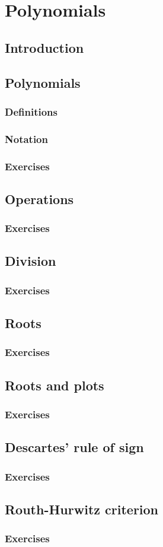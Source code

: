 \chapter{Polynomials}
\section{Introduction}
\section{Polynomials}
\subsection{Definitions}
\subsection{Notation}
\subsection{Exercises}
\section{Operations}
\subsection{Exercises}
\section{Division}
\subsection{Exercises}
\section{Roots}
\subsection{Exercises}
\section{Roots and plots}
\subsection{Exercises}
\section{Descartes' rule of sign}
\subsection{Exercises}
\section{Routh-Hurwitz criterion}
\subsection{Exercises}



